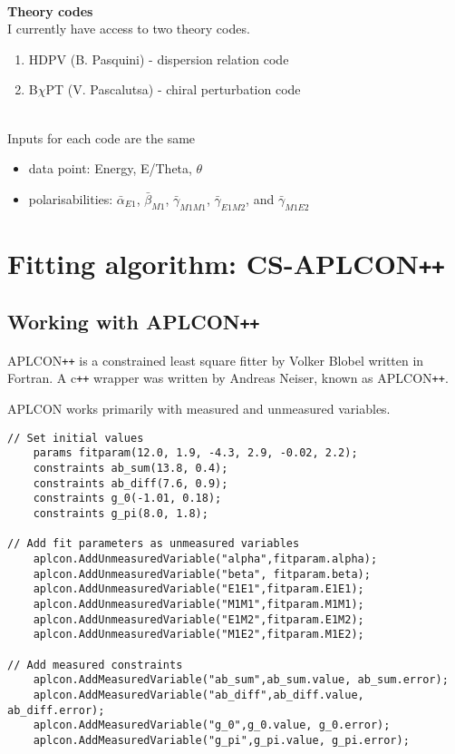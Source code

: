 \documentclass[]{article}
\begin{document}
\noindent\\ \textbf{Theory codes} \\

\noindent I currently have access to two theory codes.
\begin{enumerate}
	\item HDPV (B. Pasquini) - dispersion relation code
	\item B$\chi$PT (V. Pascalutsa) - chiral perturbation code
\end{enumerate}

\noindent \\Inputs for each code are the same
\begin{itemize}
	\item data point: Energy, E/Theta, $\theta$
	\item polarisabilities: $\bar{\alpha}_{E1}$, $\bar{\beta}_{M1}$, $\bar{\gamma}_{M1M1}$, $\bar{\gamma}_{E1M2}$, and $\bar{\gamma}_{M1E2}$
\end{itemize}

\newpage
\section{Fitting algorithm: CS-APLCON\texttt{++}}
\subsection{Working with APLCON\texttt{++}}

APLCON\texttt{++} is a constrained least square fitter by Volker Blobel written in Fortran. A c\texttt{++} wrapper was written by Andreas Neiser, known as APLCON\texttt{++}. 

\noindent APLCON works primarily with measured and unmeasured variables. 

\begin{lstlisting}
// Set initial values
    params fitparam(12.0, 1.9, -4.3, 2.9, -0.02, 2.2);
    constraints ab_sum(13.8, 0.4);
    constraints ab_diff(7.6, 0.9);
    constraints g_0(-1.01, 0.18);
    constraints g_pi(8.0, 1.8);

// Add fit parameters as unmeasured variables
    aplcon.AddUnmeasuredVariable("alpha",fitparam.alpha);
    aplcon.AddUnmeasuredVariable("beta", fitparam.beta);
    aplcon.AddUnmeasuredVariable("E1E1",fitparam.E1E1);
    aplcon.AddUnmeasuredVariable("M1M1",fitparam.M1M1);
    aplcon.AddUnmeasuredVariable("E1M2",fitparam.E1M2);
    aplcon.AddUnmeasuredVariable("M1E2",fitparam.M1E2);
    
// Add measured constraints
    aplcon.AddMeasuredVariable("ab_sum",ab_sum.value, ab_sum.error);
    aplcon.AddMeasuredVariable("ab_diff",ab_diff.value, ab_diff.error);
    aplcon.AddMeasuredVariable("g_0",g_0.value, g_0.error);
    aplcon.AddMeasuredVariable("g_pi",g_pi.value, g_pi.error);
\end{lstlisting}
\end{document}
